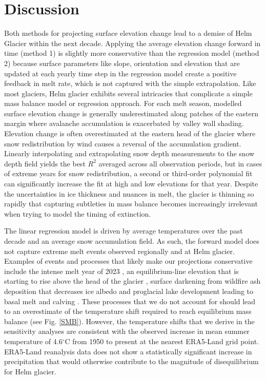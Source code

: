 \documentclass[annals,review,oneside]{igs}
\begin{document}

\section{Discussion}

Both methods for projecting surface elevation change lead to a demise of Helm Glacier within the next decade. Applying the average elevation change forward in time (method 1) is slightly more conservative than the regression model (method 2) because surface parameters like slope, orientation and elevation that are updated at each yearly time step in the regression model create a positive feedback in melt rate, which is not captured with the simple extrapolation. Like most glaciers, Helm glacier exhibits several intricacies that complicate a simple mass balance model or regression approach. For each melt season, modelled surface elevation change is generally underestimated along patches of the eastern margin where avalanche accumulation is exacerbated by valley wall shading. Elevation change is often overestimated at the eastern head of the glacier where snow redistribution by wind causes a reversal of the accumulation gradient. Linearly interpolating and extrapolating snow depth measurements to the snow depth field yields the best $R^2$ averaged across all observation periods, but in cases of extreme years for snow redistribution, a second or third-order polynomial fit can significantly increase the fit at high and low elevations for that year. Despite the uncertainties in ice thickness and nuances in melt, the glacier is thinning so rapidly that capturing subtleties in mass balance becomes increasingly irrelevant when trying to model the timing of extinction.

The linear regression model is driven by average temperatures over the past decade and an average snow accumulation field. As such, the forward model does not capture extreme melt events observed regionally and at Helm glacier. Examples of events and processes that likely make our projections conservative include the intense melt year of 2023 \citep{Menounos2025}, an equilibrium-line elevation that is starting to rise above the head of the glacier \citep{Bevington2025}, surface darkening from wildfire ash deposition that decreases ice albedo \citep{Menounos2025,AubryWake2022} and proglacial lake development leading to basal melt and calving \citep{Carrivick2013,Shugar2020}. These processes that we do not account for should lead to an overestimate of the temperature shift required to reach equilibrium mass balance (see Fig. \ref{SMB}). However, the temperature shifts that we derive in the sensitivity analyses are consistent with the observed increase in mean summer temperature of 4.6$^\circ$C from 1950 to present at the nearest ERA5-Land grid point. ERA5-Land reanalysis data does not show a statistically significant increase in precipitation that would otherwise contribute to the magnitude of disequilibrium for Helm glacier. 
\end{document}
